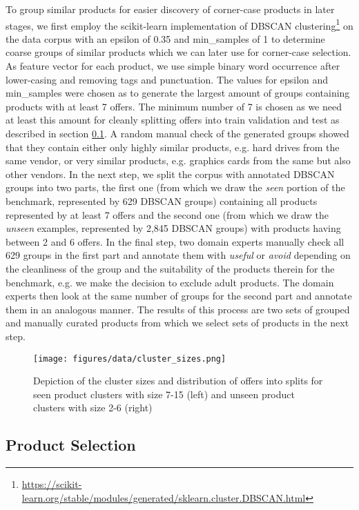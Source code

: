 \documentclass[sigconf,edbt]{acmart-edbt2024}
\begin{document}
To group similar products for easier discovery of corner-case products in later stages, we first employ the scikit-learn implementation of DBSCAN clustering\footnote{\url{https://scikit-learn.org/stable/modules/generated/sklearn.cluster.DBSCAN.html}} on the data corpus with an epsilon of 0.35 and min\_samples of 1 to determine coarse groups of similar products which we can later use for corner-case selection. As feature vector for each product, we use simple binary word occurrence after lower-casing and removing tags and punctuation. The values for epsilon and min\_samples were chosen as to generate the largest amount of groups containing products with at least 7 offers. The minimum number of 7 is chosen as we need at least this amount for cleanly splitting offers into train validation and test as described in section \ref{subsec:building}. A random manual check of the generated groups showed that they contain either only highly similar products, e.g. hard drives from the same vendor, or very similar products, e.g. graphics cards from the same but also other vendors. In the next step, we split the corpus with annotated DBSCAN groups into two parts, the first one (from which we draw the \textit{seen} portion of the benchmark, represented by 629 DBSCAN groups) containing all products represented by at least 7 offers and the second one (from which we draw the \textit{unseen} examples, represented by 2,845 DBSCAN groups) with products having between 2 and 6 offers. In the final step, two domain experts manually check all 629 groups in the first part and annotate them with \textit{useful} or \textit{avoid} depending on the cleanliness of the group and the suitability of the products therein for the benchmark, e.g. we make the decision to exclude adult products. The domain experts then look at the same number of groups for the second part and annotate them in an analogous manner. The results of this process are two sets of grouped and manually curated products from which we select sets of products in the next step.

\begin{figure}
  \centering
  \texttt{[image: figures/data/cluster\_sizes.png]}
  \caption{Depiction of the cluster sizes and distribution of offers into splits for seen product clusters with size 7-15 (left) and unseen product clusters with size 2-6 (right)}
  \label{fig:clustersizes}
\end{figure} 
\subsection{Product Selection}
\label{subsec:building}
\end{document}
